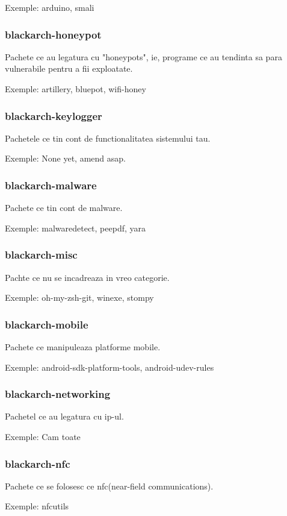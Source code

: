 \documentclass[a4paper, oneside, 11pt]{book}
\begin{document}
Exemple: arduino, smali

\subsubsection{blackarch-honeypot}
Pachete ce au legatura cu "honeypots", ie, programe ce au tendinta sa para vulnerabile pentru a fii exploatate.

Exemple: artillery, bluepot, wifi-honey

\subsubsection{blackarch-keylogger}
Pachetele ce tin cont de functionalitatea sistemului tau.

Exemple: None yet, amend asap.

\subsubsection{blackarch-malware}
Pachete ce tin cont de malware.

Exemple: malwaredetect, peepdf, yara

\subsubsection{blackarch-misc}
Pachte ce nu se incadreaza in vreo categorie.

Exemple: oh-my-zsh-git, winexe, stompy

\subsubsection{blackarch-mobile}
Pachete ce manipuleaza platforme mobile.

Exemple: android-sdk-platform-tools, android-udev-rules

\subsubsection{blackarch-networking}
Pachetel ce au legatura cu ip-ul.

Exemple: Cam toate 

\subsubsection{blackarch-nfc}
Pachete  ce se folosesc ce nfc(near-field communications).

Exemple: nfcutils
\end{document}

